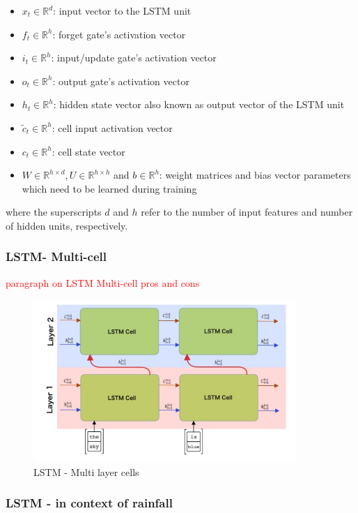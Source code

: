 \documentclass[12pt]{report}
\begin{document}
\begin{itemize}
	\item $x_t \in \mathbb{R}^{d}$: input vector to the LSTM unit 
	\item $f_t \in \mathbb{R}^{h}$: forget gate's activation vector
	\item $i_t \in \mathbb{R}^{h}$: input/update gate's activation vector 
	\item $o_t \in \mathbb{R}^{h}$: output gate's activation vector
	\item $h_t \in \mathbb{R}^{h}$: hidden state vector also known as output vector of the LSTM unit 
	\item $\tilde{c}_t \in \mathbb{R}^{h}$: cell input activation vector
	\item $c_t \in \mathbb{R}^{h}$: cell state vector
	\item $W \in \mathbb{R}^{h \times d}, U \in \mathbb{R}^{h \times h} $ and $b \in \mathbb{R}^{h}$: weight matrices and bias vector parameters which need to be learned during training
\end{itemize}

where the superscripts $d$ and $h$ refer to the number of input features and number of hidden units, respectively.


\subsubsection{LSTM- Multi-cell}
\textcolor{red}{paragraph on LSTM Multi-cell pros and cons}\\
\begin{figure}[H]\centering\includegraphics[width=10cm]{LSTM_MULTI.png}\caption{LSTM - Multi layer cells}\end{figure}
\subsubsection{LSTM - in context of rainfall}
\end{document}
